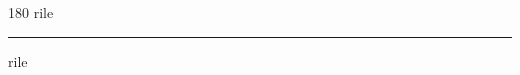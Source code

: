 
\begin{frame}
\begin{center}
\begin{turn}{180}
{\fontsize{2.5cm}{1em}\selectfont rile}
\end{turn}
\vspace{1em}\par  
\hrule
\vspace{1em}\par  
{\fontsize{2.5cm}{1em}\selectfont rile}
\end{center}
\end{frame}
